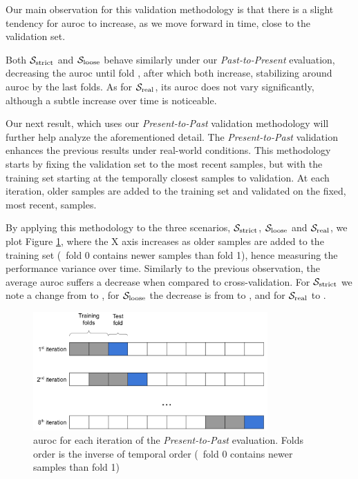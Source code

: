 Our main observation for this validation methodology is that there is a slight tendency for \gls{auroc} to increase, as we move forward in time, close to the validation set.

Both $\mathcal{S}_{\mathrm{strict}}$ and $\mathcal{S}_{\mathrm{loose}}$ behave similarly under our \textit{Past-to-Present} evaluation, decreasing the \gls{auroc} until fold , after which both increase, stabilizing around  \gls{auroc} by the last  folds. As for $\mathcal{S}_{\mathrm{real}}$, its \gls{auroc} does not vary significantly, although a subtle increase over time is noticeable.

\medskip

Our next result, which uses our \textit{Present-to-Past} validation methodology will further help analyze the aforementioned detail.
The \textit{Present-to-Past} validation enhances the previous results under real-world conditions.
This methodology starts by fixing the validation set to the most recent samples, but with the training set starting at the temporally closest samples to validation.
At each iteration, older samples are added to the training set and validated on the fixed, most recent, samples.

By applying this methodology to the three scenarios, $\mathcal{S}_{\mathrm{strict}}$, $\mathcal{S}_{\mathrm{loose}}$ and $\mathcal{S}_{\mathrm{real}}$, we plot Figure \ref{fig:presentpast}, where the X axis increases as older samples are added to the training set (\ie\ fold 0 contains newer samples than fold 1), hence measuring the performance variance over time.
Similarly to the previous observation, the average \gls{auroc} suffers a decrease when compared to cross-validation. For $\mathcal{S}_{\mathrm{strict}}$ we note a change from  to , for $\mathcal{S}_{\mathrm{loose}}$ the decrease is from  to , and for $\mathcal{S}_{\mathrm{real}}$  to .

\begin{figure}[!h]
	\centering
	\includegraphics[width=0.8\textwidth]{Figures/dia_slidingwindow.png}
	\caption[Single layer results for static features in \textit{Present-to-Past}.]{\gls{auroc} for each iteration of the \textit{Present-to-Past} evaluation. Folds order is the inverse of temporal order (\ie\ fold 0 contains newer samples than fold 1)}
	\label{fig:presentpast}
\end{figure}

